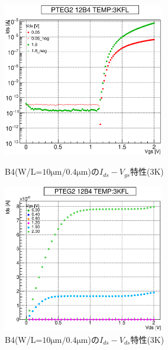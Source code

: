 				\begin{figure}[htbp]
					\begin{minipage}{0.5\hsize}
						\begin{center}
							\includegraphics[width=70mm]{./Chapter/Appendix/Picture/NBT/B4/PTEG2_12_B4_IdVg_3KFL.eps}
						\end{center}
						\caption{B4(W/L=$10\mathrm{\mu m}/0.4\mathrm{\mu m}$)の$I_{ds}-V_{gs}$特性(3K)}
						\label{fig:B4_IdVg_3K}
					\end{minipage}
					\begin{minipage}{0.5\hsize}
						\begin{center}
							\includegraphics[width=70mm]{./Chapter/Appendix/Picture/NBT/B4/PTEG2_12_B4_IdVd_3KFL.eps}
						\end{center}
						\caption{B4(W/L=$10\mathrm{\mu m}/0.4\mathrm{\mu m}$)の$I_{ds}-V_{ds}$特性(3K)}
						\label{fig:B4_IdVd_3K}
					\end{minipage}
				\end{figure}
				\clearpage
